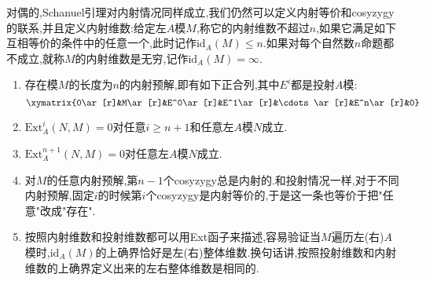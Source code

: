 对偶的,Schanuel引理对内射情况同样成立,我们仍然可以定义内射等价和cosyzygy的联系,并且定义内射维数:给定左$A$模$M$,称它的内射维数不超过$n$,如果它满足如下互相等价的条件中的任意一个,此时记作$\mathrm{id}_A(M)\le n$.如果对每个自然数$n$命题都不成立,就称$M$的内射维数是无穷,记作$\mathrm{id}_A(M)=\infty$.
\begin{enumerate}
	\item 存在模$M$的长度为$n$的内射预解,即有如下正合列,其中$E^i$都是投射$A$模:
	$$\xymatrix{0\ar[r]&M\ar[r]&E^0\ar[r]&E^1\ar[r]&\cdots\ar[r]&E^n\ar[r]&0}$$
	\item $\mathrm{Ext}_A^i(N,M)=0$对任意$i\ge n+1$和任意左$A$模$N$成立.
	\item $\mathrm{Ext}_A^{n+1}(N,M)=0$对任意左$A$模$N$成立.
	\item 对$M$的任意内射预解,第$n-1$个cosyzygy总是内射的.和投射情况一样,对于不同内射预解,固定$i$的时候第$i$个cosyzygy是内射等价的,于是这一条也等价于把"任意"改成"存在".
	\item 按照内射维数和投射维数都可以用Ext函子来描述,容易验证当$M$遍历左(右)$A$模时,$\mathrm{id}_A(M)$的上确界恰好是左(右)整体维数.换句话讲,按照投射维数和内射维数的上确界定义出来的左右整体维数是相同的.
\end{enumerate}

